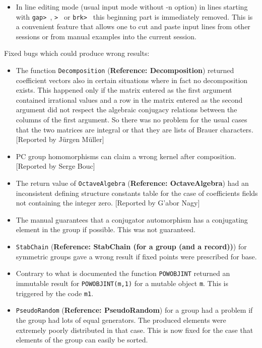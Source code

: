 \documentclass[a4paper,11pt]{report}
\begin{document}
{{\begin{itemize}
 
\item  In line editing mode (usual input mode without -n option) in lines starting
with \texttt{gap{\textgreater} }, \texttt{{\textgreater} } or \texttt{brk{\textgreater} } this beginning part is immediately removed. This is a convenient feature that
allows one to cut and paste input lines from other sessions or from manual
examples into the current session. 
\end{itemize}
 Fixed bugs which could produce wrong results: 
\begin{itemize}
\item  The function \texttt{Decomposition} (\textbf{Reference: Decomposition}) returned coefficient vectors also in certain situations where in fact no
decomposition exists. This happened only if the matrix entered as the first
argument contained irrational values and a row in the matrix entered as the
second argument did not respect the algebraic conjugacy relations between the
columns of the first argument. So there was no problem for the usual cases
that the two matrices are integral or that they are lists of Brauer
characters. [Reported by J{\"u}rgen M{\"u}ller] 
\item  PC group homomorphisms can claim a wrong kernel after composition. [Reported
by Serge Bouc] 
\item  The return value of \texttt{OctaveAlgebra} (\textbf{Reference: OctaveAlgebra}) had an inconsistent defining structure constants table for the case of
coefficients fields not containing the integer zero. [Reported by G{\a'a}bor
Nagy] 
\item  The manual guarantees that a conjugator automorphism has a conjugating element
in the group if possible. This was not guaranteed. 
\item  \texttt{StabChain} (\textbf{Reference: StabChain (for a group (and a record))}) for symmetric groups gave a wrong result if fixed points were prescribed for
base. 
\item  Contrary to what is documented the function \texttt{POW{\textunderscore}OBJ{\textunderscore}INT} returned an immutable result for \texttt{POW{\textunderscore}OBJ{\textunderscore}INT(m,1)} for a mutable object \texttt{m}. This is triggered by the code \texttt{m\texttt{}1}. 
\item  \texttt{PseudoRandom} (\textbf{Reference: PseudoRandom}) for a group had a problem if the group had lots of equal generators. The
produced elements were extremely poorly distributed in that case. This is now
fixed for the case that elements of the group can easily be sorted. 

\end{itemize}}}
\end{document}
